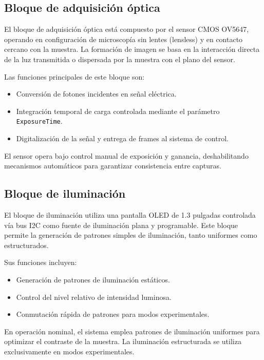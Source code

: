 \subsection{Bloque de adquisición óptica}

El bloque de adquisición óptica está compuesto por el sensor CMOS OV5647,
operando en configuración de microscopía sin lentes (lensless) y en contacto
cercano con la muestra. La formación de imagen se basa en la interacción directa
de la luz transmitida o dispersada por la muestra con el plano del sensor.

Las funciones principales de este bloque son:
\begin{itemize}
    \item Conversión de fotones incidentes en señal eléctrica.
    \item Integración temporal de carga controlada mediante el parámetro
    \texttt{ExposureTime}.
    \item Digitalización de la señal y entrega de frames al sistema de control.
\end{itemize}

El sensor opera bajo control manual de exposición y ganancia, deshabilitando
mecanismos automáticos para garantizar consistencia entre capturas.

\subsection{Bloque de iluminación}

El bloque de iluminación utiliza una pantalla OLED de 1.3 pulgadas controlada
vía bus I2C como fuente de iluminación plana y programable. Este bloque permite
la generación de patrones simples de iluminación, tanto uniformes como
estructurados.

Sus funciones incluyen:
\begin{itemize}
    \item Generación de patrones de iluminación estáticos.
    \item Control del nivel relativo de intensidad luminosa.
    \item Conmutación rápida de patrones para modos experimentales.
\end{itemize}

En operación nominal, el sistema emplea patrones de iluminación uniformes para
optimizar el contraste de la muestra. La iluminación estructurada se utiliza
exclusivamente en modos experimentales.

